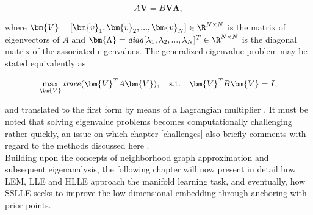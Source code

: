 \begin{equation}
  A \bm{V} = B \bm{V} \bm{\Lambda},
  \label{eq-gevproblem}
\end{equation}

where $\bm{V} = [\bm{v}_1, \bm{v}_2, ..., \bm{v}_N] \in \R^{N \times N}$ 
is the matrix of eigenvectors of $A$ and 
$\bm{\Lambda} = \text{\textit{diag}}[\lambda_1, \lambda_2, ..., \lambda_N]^T 
\in \R^{N \times N}$ is the diagonal matrix of the associated eigenvalues.
The generalized eigenvalue problem may be stated equivalently as 

\begin{equation}
  \max_{\bm{V}} \text{\textit{trace}}(\bm{V}^T A \bm{V}), \quad \text{s.t.} 
  \quad \bm{V}^T B \bm{V} = I,
  \label{eq-gevproblem-max}
\end{equation}

and translated to the first form by means of a Lagrangian multiplier \citep{ghojoghetal2019}.
It must be noted that solving eigenvalue problems becomes computationally 
challenging rather quickly, an issue on which chapter \ref{challenges} 
also briefly comments with regard to the methods discussed here 
\citep{boermmehl2012}.
\\

Building upon the concepts of neighborhood graph approximation and subsequent 
eigenanalysis, the following chapter will now present in detail how LEM, LLE and 
HLLE approach the manifold learning task, and eventually, how SSLLE seeks to 
improve the low-dimensional embedding through anchoring with prior points.
